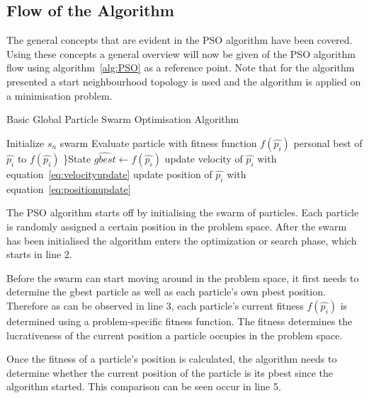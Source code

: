 \subsection{Flow of the Algorithm}
The general concepts that are evident in the \gls{PSO} algorithm have been covered. Using these concepts a general overview will now be given of the \gls{PSO} algorithm flow using algorithm~\ref{alg:PSO} as a reference point. Note that for the algorithm presented a start neighbourhood topology is used and the algorithm is applied on a minimisation problem.
\begin{algorithm}[H]
\caption{Basic Global Particle Swarm Optimisation Algorithm\cite{CompuIntelligenceIntro}}
\label{alg:PSO}
	\begin{algorithmic}[1]
		\State Initialize $s_n$ swarm
				\State Evaluate particle with fitness function $f(\hat{p_i})$
					\State personal best of $\hat{p_i}$ to $f(\hat{p_i})$
				\EndIf
					\}State $\hat{gbest} \leftarrow f(\hat{p_i})$
				\EndIf
			\EndFor
				\State update velocity of $\hat{p_i}$ with equation~\ref{eq:velocityupdate}
				\State update position of $\hat{p_i}$ with equation~\ref{eq:positionupdate}
			\EndFor
		\EndWhile
	\end{algorithmic}
\end{algorithm}

The \gls{PSO} algorithm starts off by initialising the swarm of particles. Each particle is randomly assigned a certain position in the problem space. After the swarm has been initialised the algorithm enters the optimization or search phase, which starts in line 2.

Before the swarm can start moving around in the problem space, it first needs to determine the gbest particle as well as each particle's own pbest position. Therefore as can be observed in line 3, each particle's current fitness $f(\hat{p_i})$ is determined using a problem-specific fitness function. The fitness determines the lucrativeness of the current position a particle occupies in the problem space.

Once the fitness of a particle's position is calculated, the algorithm needs to determine whether the current position of the particle is its pbest since the algorithm started. This comparison can be seen occur in line 5. 

